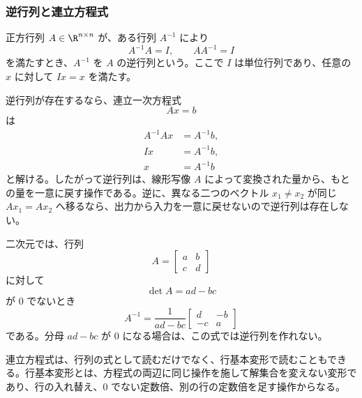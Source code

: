 \subsubsection{逆行列と連立方程式}

正方行列 $A\in\R^{n\times n}$ が、ある行列 $A^{-1}$ により
\begin{equation}
  A^{-1}A=I,\qquad AA^{-1}=I
\end{equation}
を満たすとき、$A^{-1}$ を $A$ の逆行列という。ここで $I$ は単位行列であり、任意の $x$ に対して $Ix=x$ を満たす。

逆行列が存在するなら、連立一次方程式
\begin{equation}
  Ax=b
\end{equation}
は
\begin{align}
  A^{-1}Ax&=A^{-1}b,\\
  Ix&=A^{-1}b,\\
  x&=A^{-1}b
\end{align}
と解ける。したがって逆行列は、線形写像 $A$ によって変換された量から、もとの量を一意に戻す操作である。逆に、異なる二つのベクトル $x_1\ne x_2$ が同じ $Ax_1=Ax_2$ へ移るなら、出力から入力を一意に戻せないので逆行列は存在しない。

二次元では、行列
\begin{equation}
  A=
  \begin{bmatrix}
    a&b\\
    c&d
  \end{bmatrix}
\end{equation}
に対して
\begin{equation}
  \det A=ad-bc
\end{equation}
が 0 でないとき
\begin{equation}
  A^{-1}
  =
  \frac{1}{ad-bc}
  \begin{bmatrix}
    d&-b\\
    -c&a
  \end{bmatrix}
\end{equation}
である。分母 $ad-bc$ が 0 になる場合は、この式では逆行列を作れない。

連立方程式は、行列の式として読むだけでなく、行基本変形で読むこともできる。行基本変形とは、方程式の両辺に同じ操作を施して解集合を変えない変形であり、行の入れ替え、0 でない定数倍、別の行の定数倍を足す操作からなる。

